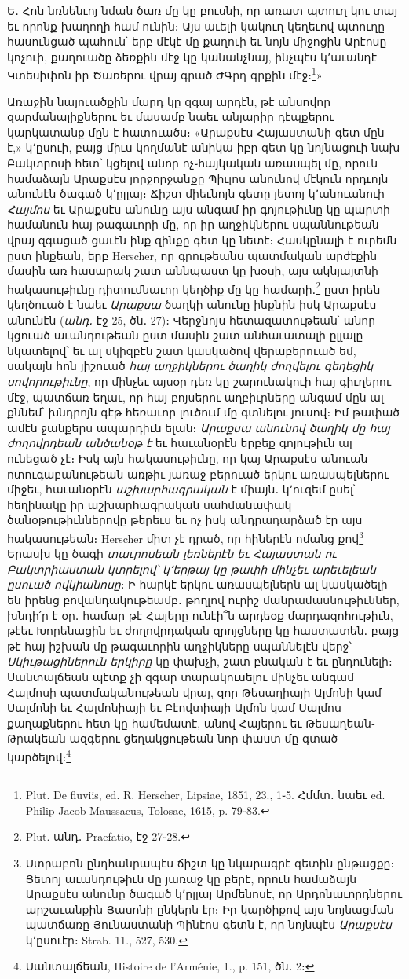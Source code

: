 \documentclass{article}
\begin{document}
{Ե․ Հոն նռնենւոյ նման ծառ մը կը բուսնի, որ առատ պտուղ կու տայ եւ որոնք խաղողի համ ունին։ Այս աւելի կակուղ կեղեւով պտուղը հասունցած պահուն՝ երբ մէկէ մը քաղուի եւ նոյն միջոցին Արէոսը կոչուի, քաղուածը ձեռքին մէջ կը կանանչնայ, ինչպէս կ՚աւանդէ Կտեսիփոն իր Ծառերու վրայ գրած ԺԳրդ գրքին մէջ։\footnote{Plut. De fluviis, ed. R. Herscher, Lipsiae, 1851, 23., 1֊5. Հմմտ․ նաեւ ed. Philip Jacob Maussacus, Tolosae, 1615, p. 79֊83.}»

Առաջին նայուածքին մարդ կը զգայ արդէն, թէ անսովոր զարմանալիքներու եւ մասամբ նաեւ անյարիր դէպքերու կարկատանք մըն է հատուածս։ «Արաքսէս Հայաստանի գետ մըն է,» կ՚ըսուի, բայց միւս կողմանէ անիկա իբր գետ կը նոյնացուի նախ Բակտրոսի հետ՝ կցելով անոր ոչ֊հայկական առասպել մը, որուն համաձայն Արաքսէս յորջորջանքը Պիւլոս անունով մէկուն որդւոյն անունէն ծագած կ՚ըլլայ։ Ճիշտ միեւնոյն գետը յետոյ կ՚անուանուի \emph{Հայմոս} եւ Արաքսէս անունը այս անգամ իր գոյութիւնը կը պարտի համանուն հայ թագաւորի մը, որ իր աղջիկներու սպաննութեան վրայ զգացած ցաւէն ինք զինքը գետ կը նետէ։ Հասկընալի է ուրեմն ըստ ինքեան, երբ Herscher, որ գրութեանս պատմական արժէքին մասին առ հասարակ շատ աննպաստ կը խօսի, այս ակնյայտնի հակասութիւնը դիտումնաւոր կեղծիք մը կը համարի․\footnote{Plut. անդ․ Praefatio, էջ 27֊28.} ըստ իրեն կեղծուած է նաեւ \emph{Արաքսա} ծաղկի անունը ինքնին իսկ Արաքսէս անունէն (\emph{անդ․} էջ 25, ծն․ 27)։ Վերջնոյս հետազատութեան՝ անոր կցուած աւանդութեան ըստ մասին շատ անհաւատալի ըլլալը նկատելով՝ եւ ալ սկիզբէն շատ կասկածով վերաբերուած եմ, սակայն հոն յիշուած \emph{հայ աղջիկներու ծաղիկ ժողվելու գեղեցիկ սովորութիւնը}, որ մինչեւ այսօր դեռ կը շարունակուի հայ գիւղերու մէջ, պատճառ եղաւ, որ հայ բոյսերու աղբիւրները անգամ մըն ալ քննեմ՝ խնդրոյն գէթ հեռաւոր լուծում մը գտնելու յուսով։ Իմ թափած ամէն ջանքերս ապարդիւն ելան։ \emph{Արաքսա անունով ծաղիկ մը հայ ժողովրդեան անծանօթ է} եւ հաւանօրէն երբեք գոյութիւն ալ ունեցած չէ։ Իսկ այն հակասութիւնը, որ կայ Արաքսէս անուան ոտուգաբանութեան առթիւ յառաջ բերուած երկու առասպելներու միջեւ, հաւանօրէն \emph{աշխարհագրական} է միայն․ կ՚ուզեմ ըսել՝ հեղինակը իր աշխարհագրական սահմանափակ ծանօթութիւններովը թերեւս եւ ոչ իսկ անդրադարձած էր այս հակասութեան։ Herscher միտ չէ դրած, որ հիներէն ոմանց քով\footnote{Ստրաբոն ընդհանրապէս ճիշտ կը նկարագրէ գետին ընթացքը։ Յետոյ աւանդութիւն մը յառաջ կը բերէ, որուն համաձայն Արաքսէս անունը ծագած կ՚ըլլայ Արմենոսէ, որ Արդոնաւորդներու արշաւանքին Յասոնի ընկերն էր։ Իր կարծիքով այս նոյնացման պատճառը Յունաստանի Պինէոս գետն է, որ նոյնպէս \emph{Արաքսէս} կ՚ըսուէր։ Strab. 11., 527, 530.} Երասխ կը ծագի \emph{տաւրոսեան լեռներէն եւ Հայաստան ու Բակտրիաստան կտրելով՝ կ՚երթայ կը թափի մինչեւ արեւելեան ըսուած ովկիանոսը}։ Ի հարկէ երկու առասպելներն ալ կասկածելի են իրենց բովանդակութեամբ․ թողլով ուրիշ մանրամասնութիւններ, խնդի՛ր է օր․ համար թէ Հայերը ունէի՞ն արդեօք մարդազոհութիւն, թէեւ Խորենացին եւ ժողովրդական զրոյցները կը հաստատեն․ բայց թէ հայ իշխան մը թագաւորին աղջիկները սպաննելէն վերջ՝ \emph{Սկիւթացիներուն երկիրը} կը փախչի, շատ բնական է եւ ընդունելի։ Սանտալճեան պէտք չի զգար տարակուսելու մինչեւ անգամ Հալմոսի պատմականութեան վրայ, զոր Թեսաղիայի Ալմոնի կամ Սալմոնի եւ Հալմոնիայի եւ Բէովտիայի Ալմոն կամ Սալմոս քաղաքներու հետ կը համեմատէ, անով Հայերու եւ Թեսաղեան֊Թրակեան ազգերու ցեղակցութեան նոր փաստ մը գտած կարծելով։\footnote{Սանտալճեան, Histoire de l'Arménie, 1., p. 151, ծն․ 2։}

}
\end{document}
